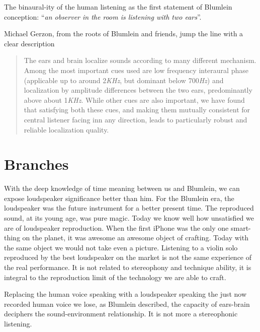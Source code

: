\documentclass{article}
\begin{document}
The binaural-ity of the human listening as the first statement of Blumlein conception: “\emph{an observer in the room is listening with two ears}”.

Michael Gerzon, from the roots of Blumlein and friends, jump the line with a clear description 

\begin{quotation}
The ears and brain localize sounds according to many different mechanism. Among the most important cues used are low frequency interaural phase (applicable up to around 2\emph{KHz}, but dominant below 700\emph{Hz}) and localization by amplitude differences between the two ears, predominantly above about 1\emph{KHz}. While other cues are also important, we have found that satisfying both these cues, and making them mutually consistent for central listener facing inn any direction, leads to particularly robust and reliable localization quality.\cite{mg92pdmsss}
\end{quotation}

\vfill\null

\newpage

\section{Branches}
\label{sec:branches}

With the deep knowledge of time meaning between us and Blumlein, we can expose loudspeaker significance better than him. For the Blumlein era, the loudspeaker was the future instrument for a better present time. The reproduced sound, at its young age, was pure magic. Today we know well how unsatisfied we are of loudspeaker reproduction. When the first iPhone was the only one smart-thing on the planet, it was awesome an awesome object of crafting. Today with the same object we would not take even a picture. Listening to a violin solo reproduced by the best loudspeaker on the market is not the same experience of the real performance. It is not related to stereophony and technique ability, it is integral to the reproduction limit of the technology we are able to craft.

Replacing the human voice speaking with a loudspeaker speaking the just now recorded human voice we lose, as Blumlein described, the capacity of ears-brain deciphers the sound-environment relationship. It is not more a stereophonic listening.
\end{document}
